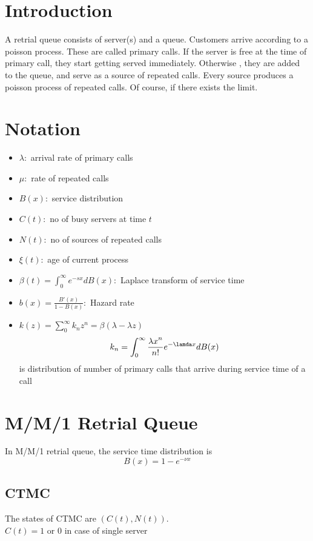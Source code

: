 \documentclass[10pt]{article}
\begin{document}
\tableofcontents
\newpage
\section{Introduction}
A retrial queue consists of server(s) and a queue. Customers arrive according to a poisson process. These are called primary calls. If the server is free at the time of primary call, they start getting served immediately. Otherwise , they are added to the queue, and serve as a source of repeated calls. Every source produces a poisson process of repeated calls. 
Of course, if there exists the limit.

\section{Notation}
\begin{itemize}
    \item $\lambda:$ arrival rate of primary calls
    \item $\mu:$ rate of repeated calls
    \item $B(x):$ service distribution
    \item $C(t):$ no of busy servers at time $t$
    \item $N(t):$ no of sources of repeated calls
    \item $\xi(t):$ age of current process
    \item $\beta(t)=\int_{0}^{\infty}e^{-sx}dB(x):$ Laplace transform of service time
    \item $b(x)=\frac{B'(x)}{1-B(x)}:$ Hazard rate
    \item $k(z)=\sum_{0}^{\infty}k_nz^n=\beta(\lambda-\lambda z)$
    $$k_n=\int_{0}^{\infty}\frac{{\lambda x}^n}{n!}e^{-\lamda x}dB(x)$$
    is distribution of number of primary calls that arrive during service time of a call
\end{itemize}

\section{M/M/1 Retrial Queue}
In M/M/1 retrial queue, the service time distribution is 
$$B(x)=1-e^{-\nu x}$$

\subsection{CTMC}
The states of CTMC are $(C(t),N(t))$.\\ 
$C(t)=1$ or $0$ in case of single server\\
\end{document}
